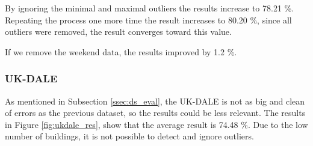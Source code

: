 By ignoring the minimal and maximal outliers the results increase to 78.21 \%.
Repeating the process one more time the result increases to 80.20 \%, since all outliers were removed, the result converges toward this value. 

If we remove the weekend data, the results improved by 1.2 \%. 

\subsubsection{UK-DALE}

As mentioned in Subsection \ref{ssec:ds_eval}, the UK-DALE is not as big and clean of errors as the previous dataset, so the results could be less relevant.
The results in Figure \ref{fig:ukdale_res}, show that the average result is 74.48 \%. 
Due to the low number of buildings, it is not possible to detect and ignore outliers.

